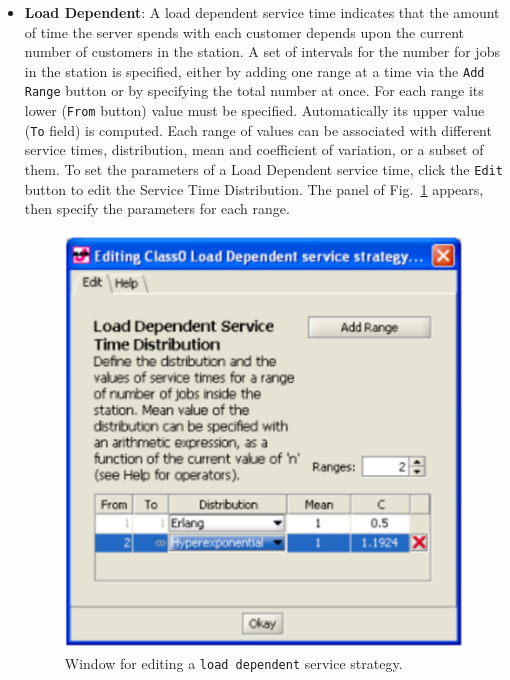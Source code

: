 \begin{itemize}
\item \textbf{Load Dependent}: A load dependent service time
indicates that the amount of time the server spends with each
customer depends upon the current number of customers in the
station. A set of intervals for the number for jobs in the station
is specified, either by adding one range at a time via the
\texttt{Add Range} button or by specifying the total number at
once. For each range its lower (\texttt{From} button) value must
be specified. Automatically its upper value (\texttt{To} field) is
computed. Each range of values can be associated with different
service times, distribution, mean and coefficient of variation, or
a subset of them. To set the parameters of a Load Dependent
service time, click the \texttt{Edit} button to edit the Service
Time Distribution. The panel of Fig.~\ref{fig:ldservstrat}
appears, then specify the parameters for each range.\\
\begin{figure}[htb]
    \begin{center}
        \includegraphics[scale=.5]{img/jsimg/8.18.eps}
    \end{center}
    \caption{Window for editing a \texttt{load dependent} service strategy.}
    \label{fig:ldservstrat}
\end{figure}

\end{itemize}
